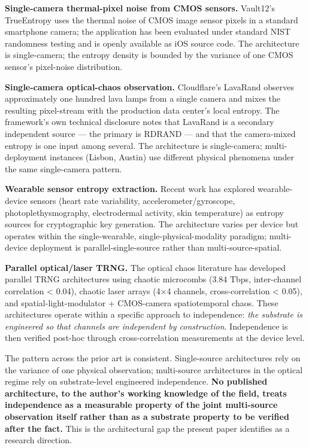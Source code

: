 \textbf{Single-camera thermal-pixel noise from CMOS sensors.} Vault12's
TrueEntropy \cite{ref3} uses the thermal noise of CMOS image sensor pixels
in a standard smartphone camera; the application has been evaluated
under standard NIST randomness testing and is openly available as iOS
source code. The architecture is single-camera; the entropy density is
bounded by the variance of one CMOS sensor's pixel-noise distribution.

\textbf{Single-camera optical-chaos observation.} Cloudflare's LavaRand
\cite{ref4} observes approximately one hundred lava lamps from a single
camera and mixes the resulting pixel-stream with the production data
center's local entropy. The framework's own technical disclosure notes
that LavaRand is a secondary independent source --- the primary is
RDRAND --- and that the camera-mixed entropy is one input among several.
The architecture is single-camera; multi-deployment instances (Lisbon,
Austin) use different physical phenomena under the same single-camera
pattern.

\textbf{Wearable sensor entropy extraction.} Recent work \cite{ref7} has
explored wearable-device sensors (heart rate variability,
accelerometer/gyroscope, photoplethysmography, electrodermal activity,
skin temperature) as entropy sources for cryptographic key generation.
The architecture varies per device but operates within the
single-wearable, single-physical-modality paradigm; multi-device
deployment is parallel-single-source rather than multi-source-spatial.

\textbf{Parallel optical/laser TRNG.} The optical chaos literature has
developed parallel TRNG architectures using chaotic microcombs \cite{ref5}
(3.84 Tbps, inter-channel correlation \textless{} 0.04), chaotic laser
arrays \cite{ref6} (4×4 channels, cross-correlation \textless{} 0.05), and
spatial-light-modulator + CMOS-camera spatiotemporal chaos. These
architectures operate within a specific approach to independence:
\emph{the substrate is engineered so that channels are independent by
construction}. Independence is then verified post-hoc through
cross-correlation measurements at the device level.

The pattern across the prior art is consistent. Single-source
architectures rely on the variance of one physical observation;
multi-source architectures in the optical regime rely on substrate-level
engineered independence. \textbf{No published architecture, to the
author's working knowledge of the field, treats independence as a
measurable property of the joint multi-source observation itself rather
than as a substrate property to be verified after the fact.} This is the
architectural gap the present paper identifies as a research direction.

